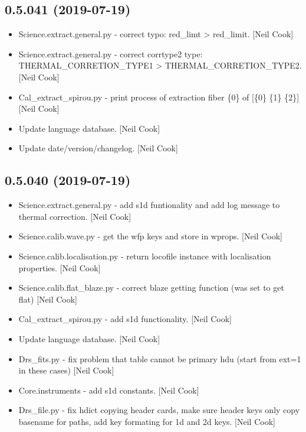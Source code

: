 \documentclass[a4paper,10pt,english]{report}
\begin{document}
\subsection{0.5.041 (2019-07-19)}
\label{\detokenize{misc/changelog:id99}}\begin{itemize}
\item {} 
Science.extract.general.py - correct typo: red\_limt \textendash{}\textgreater{} red\_limit.
{[}Neil Cook{]}

\item {} 
Science.extract.general.py - correct corrtype2 type:
THERMAL\_CORRETION\_TYPE1 \textendash{}\textgreater{} THERMAL\_CORRETION\_TYPE2. {[}Neil Cook{]}

\item {} 
Cal\_extract\_spirou.py - print process of extraction fiber \{0\} of {[}\{0\}
\{1\} \{2\}{]} {[}Neil Cook{]}

\item {} 
Update language database. {[}Neil Cook{]}

\item {} 
Update date/version/changelog. {[}Neil Cook{]}

\end{itemize}


\subsection{0.5.040 (2019-07-19)}
\label{\detokenize{misc/changelog:id100}}\begin{itemize}
\item {} 
Science.extract.general.py - add s1d funtionality and add log message
to thermal correction. {[}Neil Cook{]}

\item {} 
Science.calib.wave.py - get the wfp keys and store in wprops. {[}Neil
Cook{]}

\item {} 
Science.calib.localisation.py - return locofile instance with
localisation properties. {[}Neil Cook{]}

\item {} 
Science.calib.flat\_blaze.py - correct blaze getting function (was set
to get flat) {[}Neil Cook{]}

\item {} 
Cal\_extract\_spirou.py - add s1d functionality. {[}Neil Cook{]}

\item {} 
Update language database. {[}Neil Cook{]}

\item {} 
Drs\_fits.py - fix problem that table cannot be primary hdu (start from
ext=1 in these cases) {[}Neil Cook{]}

\item {} 
Core.instruments - add s1d constants. {[}Neil Cook{]}

\item {} 
Drs\_file.py - fix hdict copying header cards, make sure header keys
only copy basename for paths, add key formating for 1d and 2d keys.
{[}Neil Cook{]}

\end{itemize}
\end{document}
